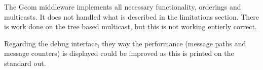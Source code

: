 The Gcom middleware implements all necessary functionality, orderings and multicasts.
It does not handled what is described in the limitations section.
There is work done on the tree based multicast, but this is not working entierly correct.

Regarding the debug interface, they way the performance (message paths and message counters) is displayed could be improved as this is printed on the standard out.
